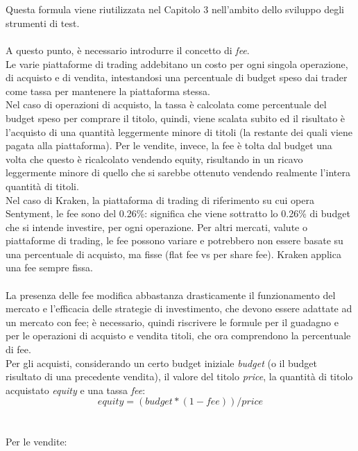 \documentclass[a4paper,12pt]{report}
\begin{document}
\\~\\
Questa formula viene riutilizzata nel Capitolo 3 nell'ambito dello sviluppo degli strumenti di test.\\~\\
A questo punto, è necessario introdurre il concetto di \textit{fee}.\\
Le varie piattaforme di trading addebitano un costo per ogni singola operazione, di acquisto e di vendita, intestandosi una percentuale di budget speso dai trader come tassa per mantenere la piattaforma stessa.\\ Nel caso di operazioni di acquisto, la tassa è calcolata come percentuale del budget speso per comprare il titolo, quindi, viene scalata subito ed il risultato è l'acquisto di una quantità leggermente minore di titoli (la restante dei quali viene pagata alla piattaforma). Per le vendite, invece, la fee è tolta dal budget una volta che questo è ricalcolato vendendo equity, risultando in un ricavo leggermente minore di quello che si sarebbe ottenuto vendendo realmente l'intera quantità di titoli.\\
Nel caso di Kraken, la piattaforma di trading di riferimento su cui opera Sentyment, le fee sono del 0.26\%: significa che viene sottratto lo 0.26\% di budget che si intende investire, per ogni operazione. Per altri mercati, valute o piattaforme di trading, le fee possono variare e potrebbero non essere basate su una percentuale di acquisto, ma fisse (flat fee vs per share fee). Kraken applica una fee sempre fissa.
\\~\\
La presenza delle fee modifica abbastanza drasticamente il funzionamento del mercato e l'efficacia delle strategie di investimento, che devono essere adattate ad un mercato con fee; è necessario, quindi riscrivere le formule per il guadagno e per le operazioni di acquisto e vendita titoli, che ora comprendono la percentuale di fee.\\
Per gli acquisti, considerando un certo budget iniziale \textit{budget} (o il budget risultato di una precedente vendita), il valore del titolo \textit{price}, la quantità di titolo acquistato \textit{equity} e una tassa \textit{fee}:\\
\begin{equation}
equity=(budget*(1-fee))/price
\end{equation}
\\~\\
Per le vendite:\\
\end{document}
